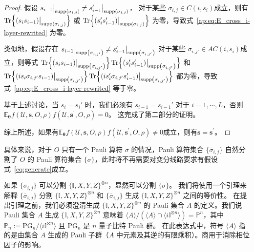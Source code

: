 \begin{lemma}
\begin{proof}
    假设 $s_{i-1}\big|_{{\text{supp} \left( \sigma_{i,j} \right)}}\neq s'_{i-1}\big|_{{\text{supp} \left( \sigma_{i,j} \right)}}$， 对于某些 $\sigma_{i,j}\in C(i,s_{i})$成立，则有 $\Tr{(s_i s_{i-1})\big|_{{\text{supp} \left( \sigma_{i,j} \right)}}}$ 或 $\Tr{(s_i' s_{i-1}')\big|_{{\text{supp} \left( \sigma_{i,j} \right)}}}$ 为零，导致式~\eqref{ap:eq:E_cross_i-layer-rewrited} 为零。
    
    类似地，假设存在 $s_{i-1}\big|_{{\text{supp} \left( \sigma_{i,j'} \right)}}\neq s'_{i-1}\big|_{{\text{supp} \left( \sigma_{i,j'} \right)}}$ 对于某些 $\sigma_{i,j'}\in AC(i,s_{i})$成立，则等式 $\Tr{(s_i s_{i-1})\big|_{{\text{supp} \left( \sigma_{i,j'} \right)}}}\Tr{(s'_i s'_{i-1})\big|_{{\text{supp} \left( \sigma_{i,j'} \right)}}}$ 和 $\Tr{(is_i \sigma_{i,j'}s_{i-1})\big|_{{\text{supp} \left( \sigma_{i,j'} \right)}}}\Tr{(is'_i \sigma_{i,j'}s'_{i-1})\big|_{{\text{supp} \left( \sigma_{i,j'} \right)}}}$ 都为零，导致 式~\eqref{ap:eq:E_cross_i-layer-rewrited} 等于零。
    
    基于上述讨论，当 $s_{i}=s_{i}'$ 时，我们必须有 $s_{i-1}=s_{i-1}'$ 对于 $i=1,\cdots,L$，否则 $\mathbb{E}_{\bm{\theta}}f(\mathcal{U},\bm{s},O,\rho)f(\mathcal{U},\bm{s^{\prime}},O,\rho)=0$。
    这完成了第二部分的证明。


    综上所述，如果有$\mathbb{E}_{\bm{\theta}}f(\mathcal{U},\bm{s},O,\rho)f(\mathcal{U},\bm{s^{\prime}},O,\rho)\neq 0$成立，则有$\bm{s}=\bm{s^{\prime}}$。
    \end{proof}
\end{lemma}
    
\begin{remark}
    具体来说，对于 $O$ 只有一个 Pauli 算符 $\sigma$ 的情况，Pauli 算符集合 $\{\overline{\sigma}_{i,j}\}$ 自然分割了 $O$ 的 Pauli 算符集合 $\{\sigma\}$，此时将不再需要对变分线路要求有假设式~\eqref{eq:generate}成立。
\end{remark}
    
如果 $\{\overline{\sigma}_{i,j}\}$ 可以分割 $\{\mathbb{I},X,Y,Z\}^{\otimes n}$，显然可以分割 $\{\sigma\}$。
我们将使用一个引理来解释 $\{\overline{\sigma}_{i,j}\}$ 分割 $\{\mathbb{I},X,Y,Z\}^{\otimes n}$ 和 $\{\overline{\sigma}_{i,j}\}$ 生成 $\{\mathbb{I},X,Y,Z\}^{\otimes n}$ 之间的等价性。
在提出引理之前，我们必须澄清生成 $\{\mathbb{I},X,Y,Z\}^{\otimes n}$ 的 Pauli 集合 $A$ 的定义。我们说 Pauli 集合 $A$ 生成 $\{\mathbb{I},X,Y,Z\}^{\otimes n}$ 意味着 $\langle A \rangle/\left( \langle A \rangle\cap\langle i\mathbb{I}^{\otimes n} \rangle \right) = \mathbb {P}^n$，其中 $\mathbb{P}_n:=\mathrm{PG}_n/\langle i\mathbb{I}^{\otimes n}\rangle$ 且 $\mathrm{PG}_n$ 是 $n$ 量子比特 Pauli 群。
在此表达式中，符号 $\langle A \rangle$ 指的是由集合 $A$ 生成的 Pauli 子群（$A$ 中元素及其逆的有限乘积）。商用于消除相位因子的影响。
    
